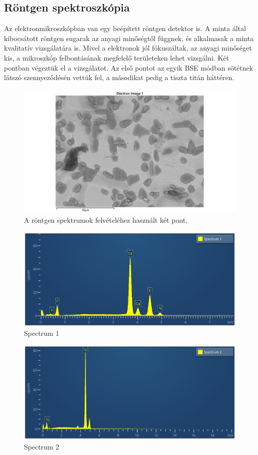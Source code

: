 \documentclass[pdftex,12pt,a4paper]{article}
\begin{document}
		\subsection{Röntgen spektroszkópia}
			Az elektronmikroszkópban van egy beépített röntgen detektor is. A minta által kibocsátott röntgen sugarak az anyagi minőségtől függnek, és alkalmasak a minta kvalitatív vizsgálatára is. Mivel a elektronok jól fókuszáltak, az anyagi minőséget kis, a mikroszkóp felbontásának megfelelő területeken lehet vizsgálni. Két pontban végeztük el a vizsgálatot. Az első pontot az egyik BSE módban sötétnek látszó szennyeződésén vettük fel, a másodikat pedig a tiszta titán háttéren.
			\begin{figure}[H]
				\centering
				\includegraphics[scale=0.7]{./figs/spots.png}
				\caption{A röntgen spektrumok felvételéhez használt két pont.}
				\label{}
			\end{figure}
			\begin{figure}[H]
				\centering
				\includegraphics[scale=0.7]{./figs/spectrum1.png}
				\caption{Spectrum 1}
				\label{specrum1}
			\end{figure}
			\begin{figure}[H]
				\centering
				\includegraphics[scale=0.7]{./figs/spectrum2.png}
				\caption{Spectrum 2}
				\label{spectrum2}
			\end{figure}
\end{document}

